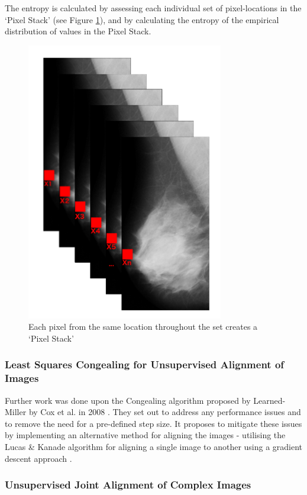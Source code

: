 The entropy is calculated by assessing each individual set of pixel-locations in the `Pixel Stack' (see Figure \ref{fig:pixel-stack}), and by calculating the entropy of the empirical distribution of values in the Pixel Stack.

\begin{figure}[H]
  \center
  \includegraphics[scale=0.5]{Chapter1/lit-review-img/pixels.png}
  \caption{Each pixel from the same location throughout the set creates a `Pixel Stack'}
  \label{fig:pixel-stack}
\end{figure}

\subsubsection{Least Squares Congealing for Unsupervised Alignment of Images}

Further work was done upon the \Gls{Congealing} algorithm proposed by Learned-Miller by Cox et al. in 2008 \cite{Cox_Sridharan_Lucey_Cohn_2008}. They set out to address any performance issues and to remove the need for a pre-defined step size. It proposes to mitigate these issues by implementing an alternative method for aligning the images - utilising the Lucas \& Kanade algorithm for aligning a single image to another using a gradient descent approach \cite{Lucas_Kanade_1981}.

\subsubsection{Unsupervised Joint Alignment of Complex Images}

